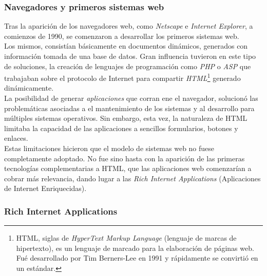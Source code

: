 \subsubsection{Navegadores y primeros sistemas web}

Tras la aparición de los navegadores web, como \emph{Netscape} e \emph{Internet Explorer},
a comienzos de 1990, se comenzaron a desarrollar los primeros sistemas web.\\
Los mismos, consistían básicamente en documentos dinámicos, generados con información
tomada de una base de datos. Gran influencia tuvieron en este tipo de soluciones, la creación
de lenguajes de programación como \emph{PHP} o \emph{ASP} que trabajaban sobre el protocolo
de Internet para compartir \emph{HTML}\footnote{
	HTML, siglas de \emph{HyperText Markup Language} (lenguaje de marcas de hipertexto), es
	un lenguaje de marcado para la elaboración de páginas web. Fué desarrollado por Tim
	Berners-Lee en 1991 y rápidamente se convirtió en un estándar.
} generado dinámicamente.\\
La posibilidad de generar \emph{aplicaciones} que corran ene el navegador, solucionó las
problemáticas asociadas a el mantenimiento de los sistemas y al desarrollo para múltiples
sistemas operativos. Sin embargo, esta vez, la naturaleza de HTML limitaba la capacidad
de las aplicaciones a sencillos formularios, botones y enlaces.\\
Estas limitaciones hicieron que el modelo de sistemas web no fuese completamente adoptado.
No fue sino hasta con la aparición de las primeras tecnologías complementarias a HTML, que
las aplicaciones web comenzarían a cobrar más relevancia, dando lugar a las \emph{Rich
Internet Applications} (Aplicaciones de Internet Enriquecidas).

\subsubsection{Rich Internet Applications}

